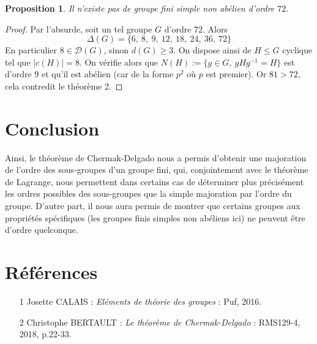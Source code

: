 \documentclass[10pt,a4paper]{article}
\newtheorem{prop}{Proposition}
\begin{document}
\begin{prop}
Il n'existe pas de groupe fini simple non abélien d'ordre $72$.
\end{prop}

\begin{proof}
Par l'absurde, soit un tel groupe $G$ d'ordre $72$. Alors $$\Delta(G)= \{6,\:8,\:9,\:12,\:18,\:24,\:36,\:72\}$$ En particulier $8 \in \mathcal{D}(G)$, sinon $d(G)\geq 3$. On dispose ainsi de $H \leq G$ cyclique tel que $|c(H)|= 8$. On vérifie alors que $N(H) := \{g \in G, \: gHg^{-1}=H\}$ est d'ordre $9$ et qu'il est abélien (car de la forme $p^2$ où $p$ est premier). Or $81 > 72$, cela contredit le théorème 2.
\end{proof}

\section*{Conclusion}

Ainsi, le théorème de Chermak-Delgado nous a permis d'obtenir une majoration de l'ordre des sous-groupes d'un groupe fini, qui, conjointement avec le théorème de Lagrange, nous permettent dans certains cas de déterminer plus précisément les ordres possibles des sous-groupes que la simple majoration par l'ordre du groupe. D'autre part, il nous aura permis de montrer que certains groupes aux propriétés spécifiques (les groupes finis simples non abéliens ici) ne peuvent être d'ordre quelconque.  

\section*{Références}
\begin{itemize}


\item[1] Josette CALAIS : \textit{Eléments de théorie des groupes} : Puf, 2016. 

\item[2] Christophe BERTAULT : \textit{Le théorème de Chermak-Delgado} : RMS129-4, 2018, p.22-33. 

\end{itemize}
\end{document}
